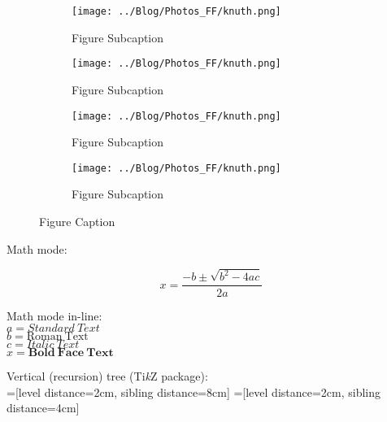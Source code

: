\documentclass[11pt, english]{article}
\begin{document}
	\begin{figure}[H]
	\begin{center}
		\begin{subfigure}[t]{5cm}
		\begin{center}
			\texttt{[image: ../Blog/Photos\_FF/knuth.png]}
		\end{center}
			\caption{Figure Subcaption}
		\end{subfigure}
                \begin{subfigure}[t]{5cm}
                \begin{center}
                        \texttt{[image: ../Blog/Photos\_FF/knuth.png]}
                \end{center}
                        \caption{Figure Subcaption}
                \end{subfigure}
	\quad
		\begin{subfigure}[t]{5cm}
		\begin{center}
			\texttt{[image: ../Blog/Photos\_FF/knuth.png]}
		\end{center}
			\caption{Figure Subcaption}
		\end{subfigure}
                \begin{subfigure}[t]{5cm}
                \begin{center}
			\texttt{[image: ../Blog/Photos\_FF/knuth.png]}
                \end{center}
                        \caption{Figure Subcaption}
                \end{subfigure}
	\end{center}
		\caption{Figure Caption}
	\end{figure}

	\newpage

	Math mode:

	$$x=\frac{-b\pm\sqrt{b^2-4ac}}{2a}$$

	Math mode in-line:\\

	$a=Standard\ Text$\\
	$b=\mathrm{Roman\ Text}$\\
	$c=\mathit{Italic\ Text}$\\
	$x=\mathbf{Bold\ Face\ Text}$
	
	\newpage

	Vertical (recursion) tree (Ti\textit{k}Z package):\\

	=[level distance=2cm, sibling distance=8cm]
        =[level distance=2cm, sibling distance=4cm]
\end{document}
